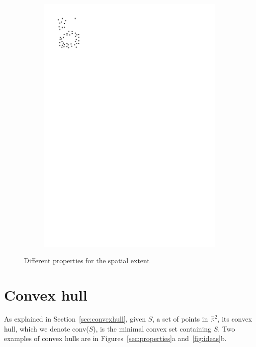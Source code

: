 \begin{figure}
\begin{subfigure}[b]{0.15\linewidth}
    \includegraphics[page=3,width=\textwidth]{figs/properties.pdf}
    \caption{}
  \end{subfigure}
\caption{Different properties for the spatial extent}
\label{fig:properties}  
\end{figure}


%
\section{Convex hull}

As explained in Section~\ref{sec:convexhull}, given $S$, a set of points in $\mathbb{R}^2$, its convex hull, which we denote conv($S$), is the minimal convex set containing $S$.
Two examples of convex hulls are in Figures~\ref{sec:properties}a and~\ref{fig:ideas}b.

%

